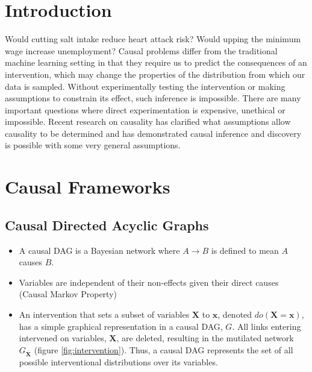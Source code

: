 \documentclass[b0,landscape,25pt]{sciposter}
\begin{document}
\begin{multicols}{5} %




\section*{Introduction}

Would cutting salt intake reduce heart attack risk? Would upping the minimum wage increase unemployment? Causal problems differ from the traditional machine learning setting in that they require us to predict the consequences of an intervention, which may change the properties of the distribution from which our data is sampled. Without experimentally testing the intervention or making assumptions to constrain its effect, such inference is impossible. There are many important questions where direct experimentation is expensive, unethical or impossible. Recent research on causality has clarified what assumptions allow causality to be determined and has demonstrated causal inference and discovery is possible with some very general assumptions.   

\section*{Causal Frameworks}
\subsection*{Causal Directed Acyclic Graphs}
\begin{itemize}
\item A causal DAG is a Bayesian network where $A \rightarrow B$ is defined to mean $A$ causes $B$.
\item Variables are independent of their non-effects given their direct causes (Causal Markov Property)
\item An intervention that sets a subset of variables $\boldsymbol{X}$ to $\boldsymbol{x}$, denoted $do(\boldsymbol{X} = \boldsymbol{x})$, has a simple graphical representation in a causal DAG, $G$. All links entering intervened on variables, $\boldsymbol{X}$, are deleted, resulting in the mutilated network $G_{\overline{\boldsymbol{X}}}$ (figure \ref{fig:intervention}). Thus, a causal DAG represents the set of all possible interventional distributions over its variables.
\end{itemize}


\end{multicols}
\end{document}
